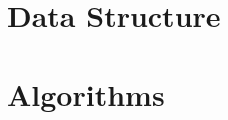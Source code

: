 \documentclass{book}
\begin{document}
\frontmatter



\mainmatter
\tableofcontents





\part{Data Structure}







\part{Algorithms}





\backmatter


\end{document}
